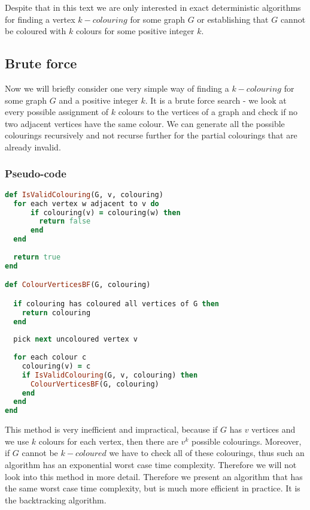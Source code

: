 \documentclass{report}
\theoremstyle{plain}
\theoremstyle{definition}
\theoremstyle{remark}
\numberwithin{definition}{chapter}
\numberwithin{example}{chapter}
\numberwithin{figure}{chapter}
\numberwithin{theorem}{chapter}
\numberwithin{lemma}{chapter}
\begin{document}
Despite that in this text we are only interested in exact deterministic algorithms for finding a vertex $k-colouring$ for some graph $G$ or establishing that $G$ cannot be coloured with $k$ colours for some positive integer $k$.

\subsection{Brute force}

Now we will briefly consider one very simple way of finding a $k-colouring$ for some graph $G$ and a positive integer $k$. It is a brute force search - we look at every possible assignment of $k$ colours to the vertices of a graph and check if no two adjacent vertices have the same colour. We can generate all the possible colourings recursively and not recurse further for the partial colourings that are already invalid. 

\subsubsection*{Pseudo-code}

\begin{lstlisting}[language=Ruby]
def IsValidColouring(G, v, colouring)
  for each vertex w adjacent to v do
      if colouring(v) = colouring(w) then
        return false
      end
  end
        
  return true
end

def ColourVerticesBF(G, colouring)

  if colouring has coloured all vertices of G then
    return colouring
  end
  
  pick next uncoloured vertex v  
  
  for each colour c
    colouring(v) = c
    if IsValidColouring(G, v, colouring) then
      ColourVerticesBF(G, colouring)
    end
  end
end
\end{lstlisting}

This method is very inefficient and impractical, because if $G$ has $v$ vertices and we use $k$ colours for each vertex, then there are $v^k$ possible colourings. Moreover, if $G$ cannot be $k-coloured$ we have to check all of these colourings, thus such an algorithm has an exponential worst case time complexity. Therefore we will not look into this method in more detail. Therefore we present an algorithm that has the same worst case time complexity, but is much more efficient in practice. It is the backtracking algorithm.
\end{document}
